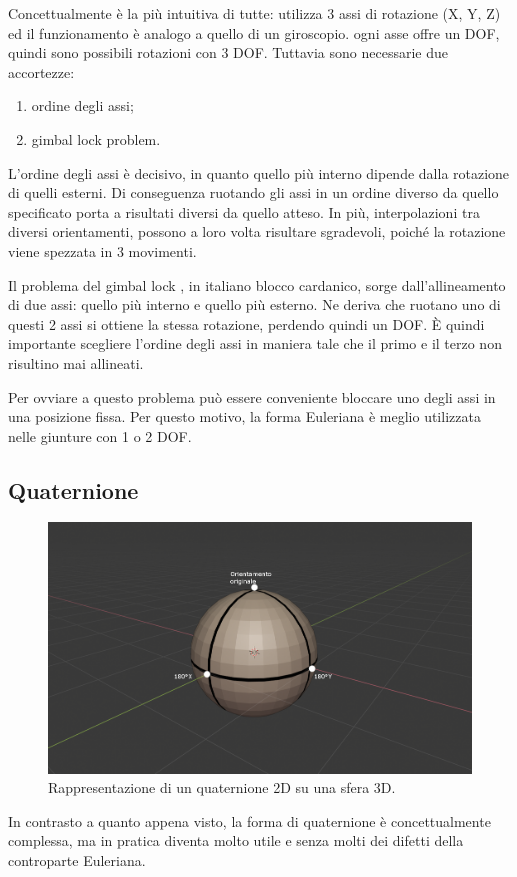 Concettualmente è la più intuitiva di tutte: utilizza 3 assi di rotazione (X, Y, Z) ed il funzionamento è analogo a quello di un giroscopio. ogni asse offre un DOF, quindi sono possibili rotazioni con 3 DOF. Tuttavia sono necessarie due accortezze: 
\begin{enumerate}
    \item ordine degli assi;
    \item gimbal lock problem.
\end{enumerate}
L'ordine degli assi è decisivo, in quanto quello più interno dipende dalla rotazione di quelli esterni. Di conseguenza ruotando gli assi in un ordine diverso da quello specificato porta a risultati diversi da quello atteso. In più, interpolazioni tra diversi orientamenti, possono a loro volta risultare sgradevoli, poiché la rotazione viene spezzata in 3 movimenti.

Il problema del gimbal lock \parencite{anticz16}, in italiano blocco cardanico, sorge dall'allineamento di due assi: quello più interno e quello più esterno. Ne deriva che ruotano uno di questi 2 assi si ottiene la stessa rotazione, perdendo quindi un DOF.
È quindi importante scegliere l'ordine degli assi in maniera tale che il primo e il terzo non risultino mai allineati.

Per ovviare a questo problema può essere conveniente bloccare uno degli assi in una posizione fissa. Per questo motivo, la forma Euleriana è meglio utilizzata nelle giunture con 1 o 2 DOF.

\newpage
\subsection{Quaternione}
\begin{figure}[ht]
\centering
\includegraphics[width=.8\textwidth]{Figures/3d-sphere}
\decoRule
\caption[Quaternione 2D]{Rappresentazione di un quaternione 2D su una sfera 3D.}
\label{fig:quater}
\end{figure}
In contrasto a quanto appena visto, la forma di quaternione è concettualmente complessa, ma in pratica diventa molto utile e senza molti dei difetti della controparte Euleriana.

